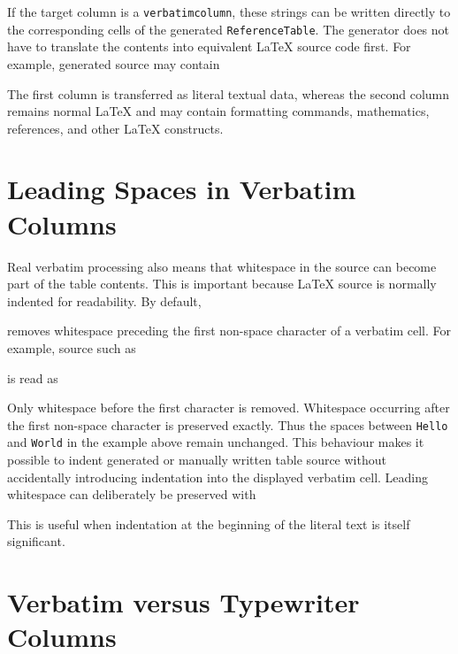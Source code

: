 \documentclass[
11pt,
a4paper,
oneside
]{scrbook}
\begin{document}


If the target column is a \texttt{verbatimcolumn}, these strings can be
written directly to the corresponding cells of the generated
\texttt{ReferenceTable}. The generator does not have to translate the
contents into equivalent \LaTeX{} source code first.
For example, generated source may contain





The first column is transferred as literal textual data, whereas the second
column remains normal \LaTeX{} and may contain formatting commands,
mathematics, references, and other \LaTeX{} constructs.

\section{Leading Spaces in Verbatim Columns}

Real verbatim processing also means that whitespace in the source can become
part of the table contents. This is important because \LaTeX{} source is
normally indented for readability.
By default,




removes whitespace preceding the first non-space character of a verbatim
cell.
For example, source such as




is read as




Only whitespace before the first character is removed. Whitespace occurring
after the first non-space character is preserved exactly. Thus the spaces
between \texttt{Hello} and \texttt{World} in the example above remain
unchanged.
This behaviour makes it possible to indent generated or manually written
table source without accidentally introducing indentation into the displayed
verbatim cell.
Leading whitespace can deliberately be preserved with




This is useful when indentation at the beginning of the literal text is
itself significant.

\section{Verbatim versus Typewriter Columns}
\end{document}
